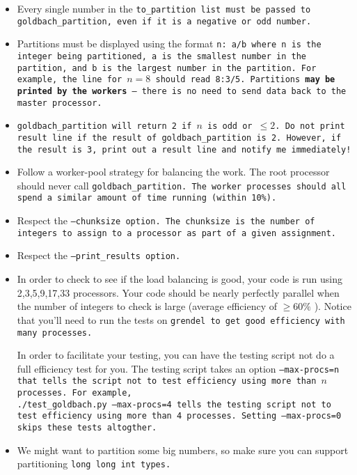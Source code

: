\documentclass{article}
\begin{document}
\begin{enumerate}
\begin{itemize}
  \item Every single number in the \tt{to\_partition} list must be
    passed to \tt{goldbach\_partition}, even if it is a negative or
      odd number.

  \item Partitions must be displayed using the format \tt{n: a/b}
    where \tt{n} is the integer being partitioned, \tt{a} is the
    smallest number in the partition, and \tt{b} is the largest number
    in the partition.  For example, the line for $n=8$ should read
    \tt{8:3/5}. Partitions \textbf{may be printed by the workers} --
    there is no need to send data back to the master processor. 

   \item \tt{goldbach\_partition} will return 2 if $n$ is odd or $\le
      2$.  Do not print result line if the result of
      \tt{goldbach\_partition} is 2.  However, if the result is 3,
      print out a result line and notify me immediately!

  \item Follow a worker-pool strategy for balancing the work.  The
    root processor should never call \tt{goldbach\_partition}.  The
    worker processes should all spend a similar amount of time running
    (within 10\%).  

  \item Respect the \tt{--chunksize} option.  The \tt{chunksize} is
    the number of integers to assign to a processor as part of a given
    assignment.  

  \item Respect the \tt{--print\_results} option. 
  
  \item In order to check to see if the load balancing is good, your
    code is run using 2,3,5,9,17,33 processors.  Your code should be
    nearly perfectly parallel when the number of integers to check is
    large (average efficiency of $\ge 60\%$ ). Notice that you'll need to run
    the tests on \tt{grendel} to get good efficiency with many
    processes. 

    In order to facilitate your testing, you can have the testing
    script not do a full efficiency test for you.  The testing script
    takes an option \tt{--max-procs=n} that tells the script not to test
    efficiency using more than $n$ processes.  For example,\\
\tt{./test\_goldbach.py --max-procs=4} tells the testing script not to
test efficiency using more than 4 processes. Setting
\tt{--max-procs=0} skips these tests altogther. 

  \item We might want to partition some big numbers, so make sure you
    can support partitioning \tt{long long int} types. 


  \end{itemize}

\end{enumerate}
\end{document}
